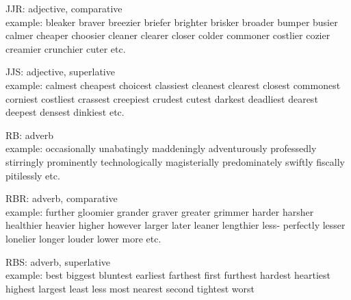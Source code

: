 JJR: adjective, comparative\\
example: bleaker braver breezier briefer brighter brisker broader bumper busier
calmer cheaper choosier cleaner clearer closer colder commoner costlier
cozier creamier crunchier cuter etc.


JJS: adjective, superlative\\
example: calmest cheapest choicest classiest cleanest clearest closest commonest
corniest costliest crassest creepiest crudest cutest darkest deadliest
dearest deepest densest dinkiest etc.


RB: adverb\\
example: occasionally unabatingly maddeningly adventurously professedly
stirringly prominently technologically magisterially predominately
swiftly fiscally pitilessly etc.


RBR: adverb, comparative\\
example: further gloomier grander graver greater grimmer harder harsher
healthier heavier higher however larger later leaner lengthier less-
perfectly lesser lonelier longer louder lower more etc.


RBS: adverb, superlative\\
example: best biggest bluntest earliest farthest first furthest hardest
heartiest highest largest least less most nearest second tightest worst
